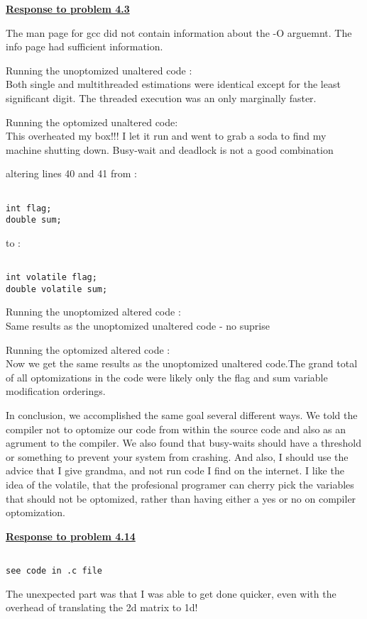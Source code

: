 \documentclass{article}
\begin{document}
\begin{lstlisting}
\end{lstlisting}

\bigskip

\noindent \textbf{\underline{Response to problem 4.3}}

\bigskip

The man page for gcc did not contain information about the -O arguemnt. The info page
had sufficient information. 

Running the unoptomized unaltered code : \\
Both single and multithreaded estimations were identical except for
the least significant digit. The threaded execution was an only
marginally faster.

Running the optomized unaltered code: \\
This overheated my box!!! I let it run and went to grab a soda to
find my machine shutting down. Busy-wait and deadlock is not a good combination

\bigskip

\noindent altering lines 40 and 41 from :

\begin{lstlisting}

int flag;
double sum;

\end{lstlisting}

\noindent to : 

\begin{lstlisting}

int volatile flag;
double volatile sum;

\end{lstlisting}

Running the unoptomized altered code : \\
Same results as the unoptomized unaltered code - no suprise

Running the optomized altered code : \\
Now we get the same results as the unoptomized unaltered code.The grand
total of all optomizations in the code were likely only the flag and sum
variable modification orderings.

\bigskip
In conclusion, we accomplished the same goal several different ways.
We told the compiler not to optomize our code from within the source
code and also as an agrument to the compiler. We also found that busy-waits
should have a threshold or something to prevent your system from crashing.
And also, I should use the advice that I give grandma, and not run code
I find on the internet. I like the idea of the volatile, that the profesional programer can cherry
pick the variables that should not be optomized, rather than having either a
yes or no on compiler optomization. 

\break

\noindent \textbf{\underline{Response to problem 4.14}}

\bigskip

\begin{lstlisting}

see code in .c file

\end{lstlisting}

The unexpected part was that I was able to get done quicker, even with the overhead of translating
the 2d matrix to 1d!
\end{document}
